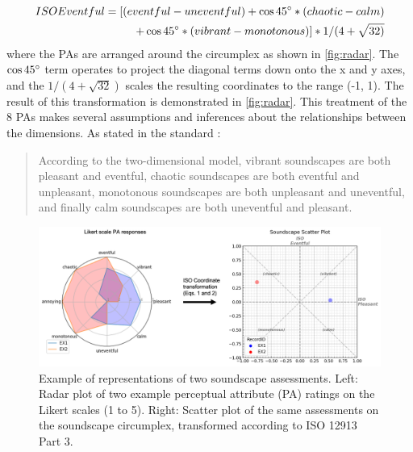 \begin{equation}
  \begin{split}
    \label{eqn:eventful}
    ISO Eventful = [(eventful - uneventful) + \cos 45\degree * (chaotic - calm) \\ + \cos 45\degree * (vibrant - monotonous)] * 1/(4+\sqrt{32)}
  \end{split}
\end{equation}
where the PAs are arranged around the circumplex as shown in \autoref{fig:radar}. The $\cos 45\degree$ term operates to project the diagonal terms down onto the x and y axes, and the $1 \slash (4 + \sqrt{32})$ scales the resulting coordinates to the range (-1, 1). The result of this transformation is demonstrated in \autoref{fig:radar}. This treatment of the 8 PAs makes several assumptions and inferences about the relationships between the dimensions. As stated in the standard \citep[p. 5]{ISO12913Part3}:

\begin{quote}
  According to the two-dimensional model, vibrant soundscapes are both pleasant and eventful, chaotic soundscapes are both eventful and unpleasant, monotonous soundscapes are both unpleasant and uneventful, and finally calm soundscapes are both uneventful and pleasant.
\end{quote}

\begin{figure}
  \includegraphics[width=\textwidth]{Figures/jasa-el_Figure1.png}
  \caption{Example of representations of two soundscape assessments. Left: Radar plot of two example perceptual attribute (PA) ratings on the Likert scales (1 to 5). Right: Scatter plot of the same assessments on the soundscape circumplex, transformed according to ISO 12913 Part 3.
    \label{fig:radar}
  }
\end{figure}


